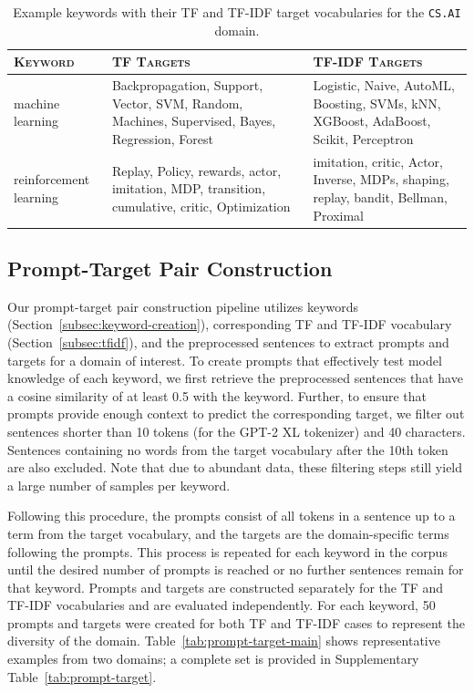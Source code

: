 \documentclass[10pt]{article}
\begin{document}
\begin{table}[t]
\centering
\caption{Example keywords with their TF and TF-IDF target vocabularies for the \texttt{CS.AI} domain.}
\label{tab:keyword-target-vocab}
\small
\begin{tabular}{p{2.5cm}p{6.25cm}p{6.25cm}}
\toprule
\textsc{Keyword} & \textsc{TF Targets} & \textsc{TF-IDF Targets} \\
\midrule
machine learning & Backpropagation, Support, Vector, SVM, Random, Machines, Supervised, Bayes, Regression, Forest & Logistic, Naive, AutoML, Boosting, SVMs, kNN, XGBoost, AdaBoost, Scikit, Perceptron \\
\midrule
reinforcement learning & Replay, Policy, rewards, actor, imitation, MDP, transition, cumulative, critic, Optimization & imitation, critic, Actor, Inverse, MDPs, shaping, replay, bandit, Bellman, Proximal \\
\bottomrule
\end{tabular}
\end{table}

\subsection{Prompt-Target Pair Construction} \vspace*{-.15cm}
\label{subsec:prompt-target}
Our prompt-target pair construction pipeline utilizes keywords (Section~\ref{subsec:keyword-creation}), corresponding TF and TF-IDF vocabulary (Section~\ref{subsec:tfidf}), and the preprocessed sentences to extract prompts and targets for a domain of interest. To create prompts that effectively test model knowledge of each keyword, we first retrieve the preprocessed sentences that have a cosine similarity of at least 0.5 with the keyword. Further, to ensure that prompts provide enough context to predict the corresponding target, we filter out sentences shorter than 10 tokens (for the GPT-2 XL tokenizer) and 40 characters. Sentences containing no words from the target vocabulary after the 10th token are also excluded. Note that due to abundant data, these filtering steps still yield a large number of samples per keyword.

Following this procedure, the prompts consist of all tokens in a sentence up to a term from the target vocabulary, and the targets are the domain-specific terms following the prompts. This process is repeated for each keyword in the corpus until the desired number of prompts is reached or no further sentences remain for that keyword. Prompts and targets are constructed separately for the TF and TF-IDF vocabularies and are evaluated independently. For each keyword, 50 prompts and targets were created for both TF and TF-IDF cases to represent the diversity of the domain. Table~\ref{tab:prompt-target-main} shows representative examples from two domains; a complete set is provided in Supplementary Table~\ref{tab:prompt-target}.
\end{document}
